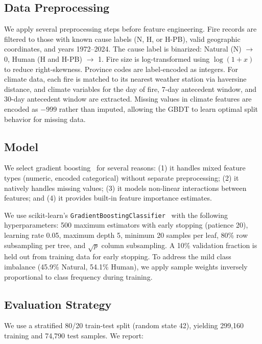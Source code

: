 \documentclass[sigconf,nonacm]{acmart}
\begin{document}
\subsection{Data Preprocessing}

We apply several preprocessing steps before feature engineering. Fire records are filtered to those with known cause labels (N, H, or H-PB), valid geographic coordinates, and years 1972--2024. The cause label is binarized: Natural (N) $\to$ 0, Human (H and H-PB) $\to$ 1. Fire size is log-transformed using $\log(1 + x)$ to reduce right-skewness. Province codes are label-encoded as integers. For climate data, each fire is matched to its nearest weather station via haversine distance, and climate variables for the day of fire, 7-day antecedent window, and 30-day antecedent window are extracted. Missing values in climate features are encoded as $-999$ rather than imputed, allowing the GBDT to learn optimal split behavior for missing data.

\subsection{Model}

We select gradient boosting~\cite{friedman2001} for several reasons: (1) it handles mixed feature types (numeric, encoded categorical) without separate preprocessing; (2) it natively handles missing values; (3) it models non-linear interactions between features; and (4) it provides built-in feature importance estimates.

We use scikit-learn's \texttt{GradientBoostingClassifier}~\cite{pedregosa2011} with the following hyperparameters: 500 maximum estimators with early stopping (patience 20), learning rate 0.05, maximum depth 5, minimum 20 samples per leaf, 80\% row subsampling per tree, and $\sqrt{p}$ column subsampling. A 10\% validation fraction is held out from training data for early stopping. To address the mild class imbalance (45.9\% Natural, 54.1\% Human), we apply sample weights inversely proportional to class frequency during training.

\subsection{Evaluation Strategy}

We use a stratified 80/20 train-test split (random state 42), yielding 299,160 training and 74,790 test samples. We report:
\end{document}
